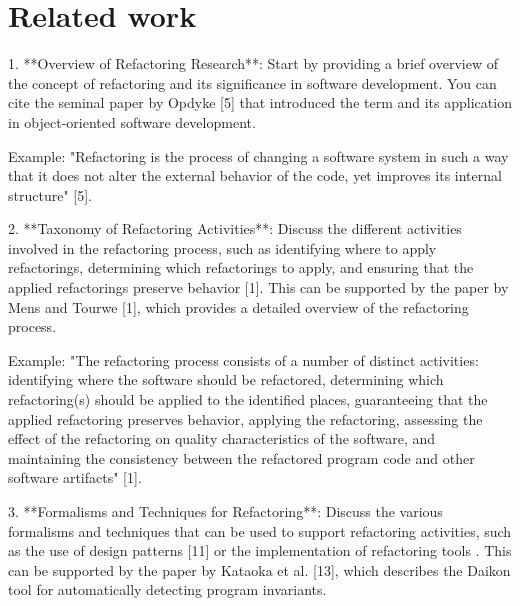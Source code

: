 
%

\chapter{Related work}
\label{cha:Related work}


1. **Overview of Refactoring Research**: Start by providing a brief overview of the concept of refactoring and its significance in software development. You can cite the seminal paper by Opdyke [5] that introduced the term and its application in object-oriented software development.

Example:
"Refactoring is the process of changing a software system in such a way that it does not alter the external behavior of the code, yet improves its internal structure" [5].

2. **Taxonomy of Refactoring Activities**: Discuss the different activities involved in the refactoring process, such as identifying where to apply refactorings, determining which refactorings to apply, and ensuring that the applied refactorings preserve behavior [1]. This can be supported by the paper by Mens and Tourwe [1], which provides a detailed overview of the refactoring process.

Example:
"The refactoring process consists of a number of distinct activities: identifying where the software should be refactored, determining which refactoring(s) should be applied to the identified places, guaranteeing that the applied refactoring preserves behavior, applying the refactoring, assessing the effect of the refactoring on quality characteristics of the software, and maintaining the consistency between the refactored program code and other software artifacts" [1].

3. **Formalisms and Techniques for Refactoring**: Discuss the various formalisms and techniques that can be used to support refactoring activities, such as the use of design patterns [11] or the implementation of refactoring tools . This can be supported by the paper by Kataoka et al. [13], which describes the Daikon tool for automatically detecting program invariants.

